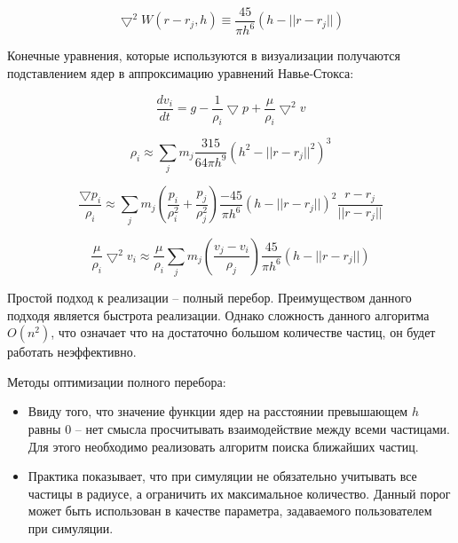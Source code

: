 \begin{equation}
\label{eq:}
\bigtriangledown^2W(r - r_j, h) \equiv \frac{45}{\pi{}h^6}(h - ||r - r_j||)
\end{equation}

Конечные уравнения, которые используются в визуализации получаются подставлением ядер
в аппроксимацию уравнений Навье-Стокса:

\begin{equation}
\label{eq:}
\frac{dv_i}{dt} = g - \frac{1}{\rho_i}\bigtriangledown{}p + \frac{\mu}{\rho_i}\bigtriangledown^2v
\end{equation}

\begin{equation}
\label{eq:}
\rho_i \approx \sum_{j}m_j\frac{315}{64\pi{}h^9} (h^2 - ||r - r_j||^2)^3
\end{equation}

\begin{equation}
\label{eq:}
\frac{\bigtriangledown{}p_i}{\rho_i} \approx \sum_{j}m_j(\frac{p_i}{\rho_i^2} + \frac{p_j}{\rho_j^2}) \frac{-45}{\pi{}h^6}(h - ||r-r_j||)^2\frac{r - r_j}{||r - r_j||}
\end{equation}

\begin{equation}
\label{eq:}
\frac{\mu}{\rho_i}\bigtriangledown^2v_i \approx \frac{\mu}{\rho_i} \sum_{j}m_j(\frac{v_j - v_i}{\rho_j})\frac{45}{\pi{}h^6}(h - ||r - r_j||)
\end{equation}

Простой подход к реализации -- полный перебор. Преимуществом данного подходя является быстрота
реализации. Однако сложность данного алгоритма $O(n^2)$, что означает что на достаточно большом
количестве частиц, он будет работать неэффективно.

Методы оптимизации полного перебора:

\begin{itemize}
  \item Ввиду того, что значение функции ядер на расстоянии превышающем $h$ равны 0 -- нет смысла
    просчитывать взаимодействие между всеми частицами. Для этого необходимо реализовать
    алгоритм поиска ближайших частиц.
  \item Практика показывает, что при симуляции не обязательно учитывать все частицы в радиусе, а
    ограничить их максимальное количество. Данный порог может быть использован в качестве
    параметра, задаваемого пользователем при симуляции.
\end{itemize}

